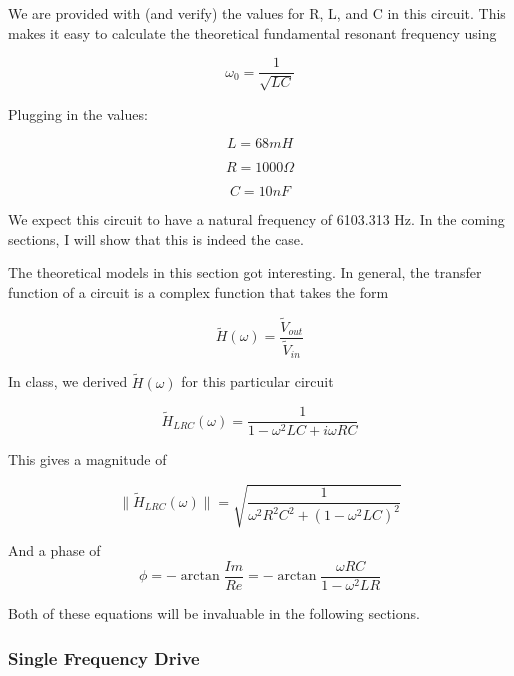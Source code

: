 \documentclass{article}
\begin{document}
We are provided with (and verify) the values for R, L, and C in this circuit.
This makes it easy to calculate the theoretical fundamental resonant frequency
using

\begin{equation}
    \omega_0 = \frac{1}{\sqrt{LC}}
\end{equation}

Plugging in the values:

\begin{equation*}
    L = 68mH
\end{equation*}

\begin{equation*}
    R = 1000 \Omega
\end{equation*}

\begin{equation*}
    C = 10nF
\end{equation*}

We expect this circuit to have a natural frequency of 6103.313 Hz. In the
coming sections, I will show that this is indeed the case. 

The theoretical models in this section got interesting. In general, the
transfer function of a circuit is a complex function that takes the form

\begin{equation}
    \tilde{H}(\omega) = \frac{\tilde{V}_{out}}{\tilde{V}_{in}}
\end{equation}

In class, we derived $\tilde{H}(\omega)$ for this particular circuit

\begin{equation}
    \tilde{H}_{LRC}(\omega) = \frac{1}{1 - \omega^2 L C + i \omega R C}
\end{equation}

This gives a magnitude of

\begin{equation}
    \|\tilde{H}_{LRC}(\omega)\| = \sqrt{\frac{1}{ \omega^2 R^2 C^2 + (1 -  \omega^ 2 L C)^2}}
\end{equation}

And a phase of 
\begin{equation}
    \phi = -\arctan{\frac{Im}{Re}} = -\arctan{\frac{\omega R C}{1 - \omega^2 L R}}
\end{equation}

Both of these equations will be invaluable in the following sections.

\subsubsection{Single Frequency Drive}%
\label{ssub:single_frequency_drive}
\end{document}
